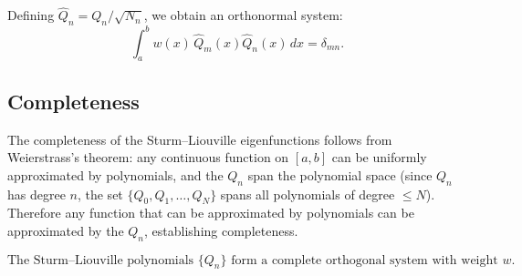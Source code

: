 \documentclass[12pt]{article}
\begin{document}
Defining $\hat{Q}_n = Q_n/\sqrt{N_n}$, we obtain an orthonormal system:
\[
\int_a^b w(x)\,\hat{Q}_m(x)\hat{Q}_n(x)\,dx = \delta_{mn}.
\]

\subsection*{Completeness}

The completeness of the Sturm--Liouville eigenfunctions follows from Weierstrass's theorem: any continuous function on $[a,b]$ can be uniformly approximated by polynomials, and the $Q_n$ span the polynomial space (since $Q_n$ has degree $n$, the set $\{Q_0, Q_1, \ldots, Q_N\}$ spans all polynomials of degree $\leq N$). Therefore any function that can be approximated by polynomials can be approximated by the $Q_n$, establishing completeness.

\[
\boxed{\text{The Sturm--Liouville polynomials } \{Q_n\} \text{ form a complete orthogonal system with weight } w.}
\]
\end{document}
